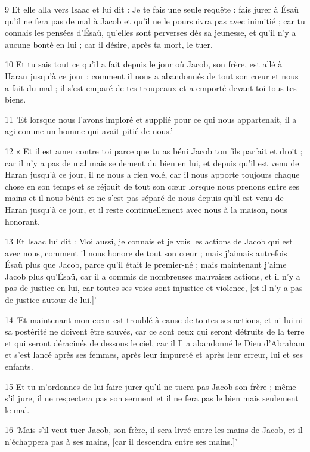 \par 9 Et elle alla vers Isaac et lui dit : Je te fais une seule requête : fais jurer à Ésaü qu'il ne fera pas de mal à Jacob et qu'il ne le poursuivra pas avec inimitié ; car tu connais les pensées d'Ésaü, qu'elles sont perverses dès sa jeunesse, et qu'il n'y a aucune bonté en lui ; car il désire, après ta mort, le tuer.
\par 10 Et tu sais tout ce qu'il a fait depuis le jour où Jacob, son frère, est allé à Haran jusqu'à ce jour : comment il nous a abandonnés de tout son cœur et nous a fait du mal ; il s'est emparé de tes troupeaux et a emporté devant toi tous tes biens.
\par 11 'Et lorsque nous l'avons imploré et supplié pour ce qui nous appartenait, il a agi comme un homme qui avait pitié de nous.'
\par 12 « Et il est amer contre toi parce que tu as béni Jacob ton fils parfait et droit ; car il n'y a pas de mal mais seulement du bien en lui, et depuis qu'il est venu de Haran jusqu'à ce jour, il ne nous a rien volé, car il nous apporte toujours chaque chose en son temps et se réjouit de tout son cœur lorsque nous prenons entre ses mains et il nous bénit et ne s'est pas séparé de nous depuis qu'il est venu de Haran jusqu'à ce jour, et il reste continuellement avec nous à la maison, nous honorant.
\par 13 Et Isaac lui dit : Moi aussi, je connais et je vois les actions de Jacob qui est avec nous, comment il nous honore de tout son cœur ; mais j'aimais autrefois Ésaü plus que Jacob, parce qu'il était le premier-né ; mais maintenant j'aime Jacob plus qu'Ésaü, car il a commis de nombreuses mauvaises actions, et il n'y a pas de justice en lui, car toutes ses voies sont injustice et violence, [et il n'y a pas de justice autour de lui.]'
\par 14 'Et maintenant mon cœur est troublé à cause de toutes ses actions, et ni lui ni sa postérité ne doivent être sauvés, car ce sont ceux qui seront détruits de la terre et qui seront déracinés de dessous le ciel, car il Il a abandonné le Dieu d'Abraham et s'est lancé après ses femmes, après leur impureté et après leur erreur, lui et ses enfants.
\par 15 Et tu m'ordonnes de lui faire jurer qu'il ne tuera pas Jacob son frère ; même s'il jure, il ne respectera pas son serment et il ne fera pas le bien mais seulement le mal.
\par 16 'Mais s'il veut tuer Jacob, son frère, il sera livré entre les mains de Jacob, et il n'échappera pas à ses mains, [car il descendra entre ses mains.]'
